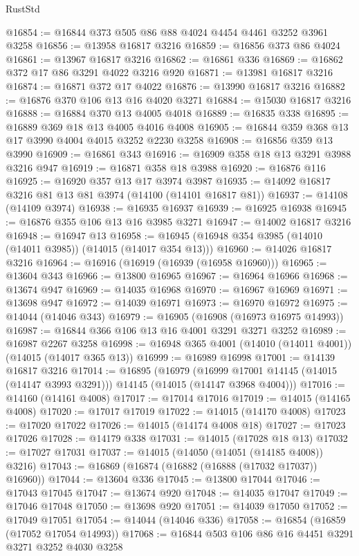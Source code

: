 \begin{lexlean}{RustStd}
\begin{coremodule}
@16854 := @16844 @373 @505 @86 @88 @4024 @4454 @4461 @3252 @3961 @3258
@16856 := @13958 @16817 @3216
@16859 := @16856 @373 @86 @4024
@16861 := @13967 @16817 @3216
@16862 := @16861 @336
@16869 := @16862 @372 @17 @86 @3291 @4022 @3216 @920
@16871 := @13981 @16817 @3216
@16874 := @16871 @372 @17 @4022
@16876 := @13990 @16817 @3216
@16882 := @16876 @370 @106 @13 @16 @4020 @3271
@16884 := @15030 @16817 @3216
@16888 := @16884 @370 @13 @4005 @4018
@16889 := @16835 @338
@16895 := @16889 @369 @18 @13 @4005 @4016 @4008
@16905 := @16844 @359 @368 @13 @17 @3990 @4004 @4015 @3252 @2230 @3258
@16908 := @16856 @359 @13 @3990
@16909 := @16861 @343
@16916 := @16909 @358 @18 @13 @3291 @3988 @3216 @947
@16919 := @16871 @358 @18 @3988
@16920 := @16876 @116
@16925 := @16920 @357 @13 @17 @3974 @3987
@16935 := @14092 @16817 @3216 @81 @13 @81 @3974 (@14100 (@14101 @16817 @81))
@16937 := @14108 (@14109 @3974)
@16938 := @16935 @16937
@16939 := @16925 @16938
@16945 := @16876 @355 @106 @13 @16 @3985 @3271
@16947 := @14002 @16817 @3216
@16948 := @16947 @13
@16958 := @16945 (@16948 @354 @3985 (@14010 (@14011 @3985)) (@14015 (@14017 @354 @13)))
@16960 := @14026 @16817 @3216
@16964 := @16916 (@16919 (@16939 (@16958 @16960)))
@16965 := @13604 @343
@16966 := @13800 @16965
@16967 := @16964 @16966
@16968 := @13674 @947
@16969 := @14035 @16968
@16970 := @16967 @16969
@16971 := @13698 @947
@16972 := @14039 @16971
@16973 := @16970 @16972
@16975 := @14044 (@14046 @343)
@16979 := @16905 (@16908 (@16973 @16975 @14993))
@16987 := @16844 @366 @106 @13 @16 @4001 @3291 @3271 @3252
@16989 := @16987 @2267 @3258
@16998 := @16948 @365 @4001 (@14010 (@14011 @4001)) (@14015 (@14017 @365 @13))
@16999 := @16989 @16998
@17001 := @14139 @16817 @3216
@17014 := @16895
    (@16979
      (@16999 @17001 @14145 (@14015 (@14147 @3993 @3291)))
      @14145
      (@14015 (@14147 @3968 @4004)))
@17016 := @14160 (@14161 @4008)
@17017 := @17014 @17016
@17019 := @14015 (@14165 @4008)
@17020 := @17017 @17019
@17022 := @14015 (@14170 @4008)
@17023 := @17020 @17022
@17026 := @14015 (@14174 @4008 @18)
@17027 := @17023 @17026
@17028 := @14179 @338
@17031 := @14015 (@17028 @18 @13)
@17032 := @17027 @17031
@17037 := @14015 (@14050 (@14051 (@14185 @4008)) @3216)
@17043 := @16869 (@16874 (@16882 (@16888 (@17032 @17037)) @16960))
@17044 := @13604 @336
@17045 := @13800 @17044
@17046 := @17043 @17045
@17047 := @13674 @920
@17048 := @14035 @17047
@17049 := @17046 @17048
@17050 := @13698 @920
@17051 := @14039 @17050
@17052 := @17049 @17051
@17054 := @14044 (@14046 @336)
@17058 := @16854 (@16859 (@17052 @17054 @14993))
@17068 := @16844 @503 @106 @86 @16 @4451 @3291 @3271 @3252 @4030 @3258

\end{coremodule}
\end{lexlean}
